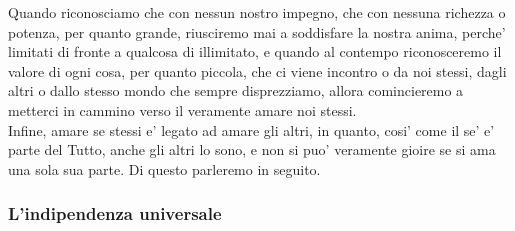 Quando riconosciamo che con nessun nostro impegno, che con nessuna richezza o potenza, per quanto grande, riusciremo mai a soddisfare la nostra anima, perche' limitati di fronte a qualcosa di illimitato, e quando al contempo riconosceremo il valore di ogni cosa, per quanto piccola, che ci viene incontro o da noi stessi, dagli altri o dallo stesso mondo che sempre disprezziamo, allora comincieremo a metterci in cammino verso il veramente amare noi stessi.\\

Infine, amare se stessi e' legato ad amare gli altri, in quanto, cosi' come il se' e' parte del Tutto, anche gli altri lo sono, e non si puo' veramente gioire se si ama una sola sua parte. Di questo parleremo in seguito.

\subsubsection{L'indipendenza universale}

